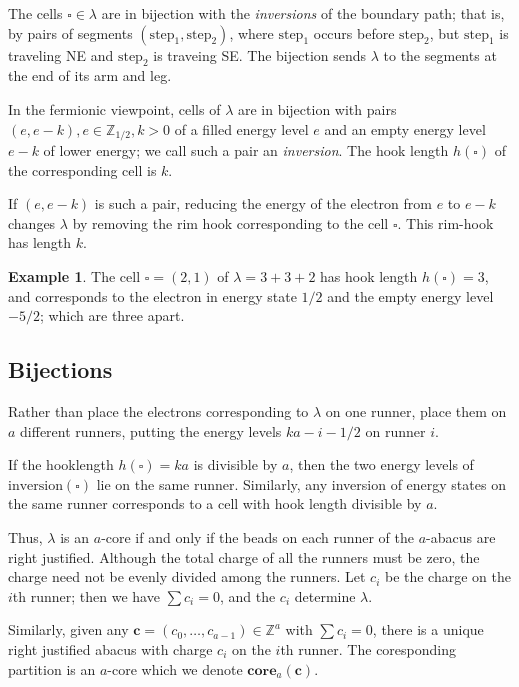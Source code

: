 \documentclass{amsart}[12pt]
\theoremstyle{definition}
\newtheorem{example}[dummy]{Example}
\newcommand{\Z}{\mathbb{Z}}
\newcommand{\core}{\mathbf{core}}
\begin{document}
The cells $\square\in\lambda$ are in bijection with the
\emph{inversions} of the boundary path; that is, by pairs of segments
$(\text{step}_1, \text{step}_2)$, where $\text{step}_1$ occurs before $\text{step}_2$,
but $\text{step}_1$ is traveling NE and $\text{step}_2$ is traveing SE.  The bijection
sends $\lambda$ to the segments at the end of its arm and leg.

In the fermionic viewpoint, cells of $\lambda$ are in
bijection with pairs $(e, e-k), e\in\Z_{1/2}, k>0$ of a filled energy level $e$ and an
empty energy level $e-k$ of lower energy; we call such a pair an \emph{inversion}.  The hook length
$h(\square)$ of the corresponding cell is $k$.

If $(e,e-k)$ is such a pair, reducing the energy of the electron from
$e$ to $e-k$ changes $\lambda$ by removing the
rim hook corresponding to the cell $\square$.  This rim-hook has
length $k$.



\begin{example}
The cell $\square=(2,1)$ of $\lambda=3+3+2$ has hook length
$h(\square)=3$, and corresponds to the electron in energy state $1/2$
and the empty energy level $-5/2$; which are three apart.

\end{example}

\subsection{Bijections}

Rather than place the electrons corresponding to $\lambda$ on one
runner, place them on $a$ different runners, putting the energy
levels $ka-i-1/2$ on runner $i$.

If the hooklength $h(\square)=ka$ is divisible by $a$, then the two
energy levels of $\textrm{inversion}(\square)$ lie on the same
runner.  Similarly, any inversion of energy states on the same
runner corresponds to a cell with hook length divisible by $a$.

Thus, $\lambda$ is an $a$-core if and only if the beads on each runner of the $a$-abacus are right justified.  Although the total charge of all the runners must be zero, the charge need not be evenly divided among the runners.  Let
$c_i$ be the charge on the $i$th runner; then we have $\sum c_i=0$, and the $c_i$ determine $\lambda$.

Similarly, given any $\mathbf{c}=(c_0,\dots,c_{a-1})\in\Z^a$ with $\sum c_i=0$, there is a unique right justified abacus with charge  $c_i$ on the $i$th runner.  The coresponding partition is an $a$-core which we denote $\core_a(\mathbf{c})$.
\end{document}
